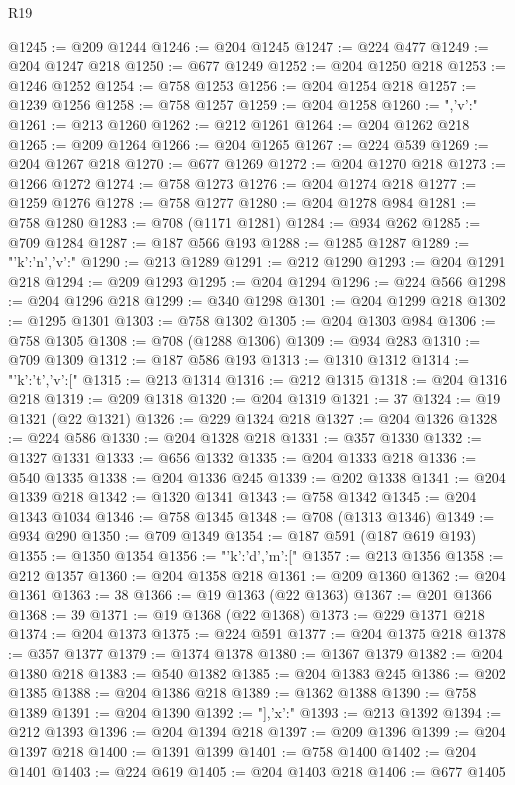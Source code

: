 \begin{lexlean}{R19}
\begin{coremodule}
{{{@1245 := @209 @1244
@1246 := @204 @1245
@1247 := @224 @477
@1249 := @204 @1247 @218
@1250 := @677 @1249
@1252 := @204 @1250 @218
@1253 := @1246 @1252
@1254 := @758 @1253
@1256 := @204 @1254 @218
@1257 := @1239 @1256
@1258 := @758 @1257
@1259 := @204 @1258
@1260 := ",'v':"
@1261 := @213 @1260
@1262 := @212 @1261
@1264 := @204 @1262 @218
@1265 := @209 @1264
@1266 := @204 @1265
@1267 := @224 @539
@1269 := @204 @1267 @218
@1270 := @677 @1269
@1272 := @204 @1270 @218
@1273 := @1266 @1272
@1274 := @758 @1273
@1276 := @204 @1274 @218
@1277 := @1259 @1276
@1278 := @758 @1277
@1280 := @204 @1278 @984
@1281 := @758 @1280
@1283 := @708 (@1171 @1281)
@1284 := @934 @262
@1285 := @709 @1284
@1287 := @187 @566 @193
@1288 := @1285 @1287
@1289 := "{'k':'n','v':"
@1290 := @213 @1289
@1291 := @212 @1290
@1293 := @204 @1291 @218
@1294 := @209 @1293
@1295 := @204 @1294
@1296 := @224 @566
@1298 := @204 @1296 @218
@1299 := @340 @1298
@1301 := @204 @1299 @218
@1302 := @1295 @1301
@1303 := @758 @1302
@1305 := @204 @1303 @984
@1306 := @758 @1305
@1308 := @708 (@1288 @1306)
@1309 := @934 @283
@1310 := @709 @1309
@1312 := @187 @586 @193
@1313 := @1310 @1312
@1314 := "{'k':'t','v':["
@1315 := @213 @1314
@1316 := @212 @1315
@1318 := @204 @1316 @218
@1319 := @209 @1318
@1320 := @204 @1319
@1321 := 37
@1324 := @19 @1321 (@22 @1321)
@1326 := @229 @1324 @218
@1327 := @204 @1326
@1328 := @224 @586
@1330 := @204 @1328 @218
@1331 := @357 @1330
@1332 := @1327 @1331
@1333 := @656 @1332
@1335 := @204 @1333 @218
@1336 := @540 @1335
@1338 := @204 @1336 @245
@1339 := @202 @1338
@1341 := @204 @1339 @218
@1342 := @1320 @1341
@1343 := @758 @1342
@1345 := @204 @1343 @1034
@1346 := @758 @1345
@1348 := @708 (@1313 @1346)
@1349 := @934 @290
@1350 := @709 @1349
@1354 := @187 @591 (@187 @619 @193)
@1355 := @1350 @1354
@1356 := "{'k':'d','m':["
@1357 := @213 @1356
@1358 := @212 @1357
@1360 := @204 @1358 @218
@1361 := @209 @1360
@1362 := @204 @1361
@1363 := 38
@1366 := @19 @1363 (@22 @1363)
@1367 := @201 @1366
@1368 := 39
@1371 := @19 @1368 (@22 @1368)
@1373 := @229 @1371 @218
@1374 := @204 @1373
@1375 := @224 @591
@1377 := @204 @1375 @218
@1378 := @357 @1377
@1379 := @1374 @1378
@1380 := @1367 @1379
@1382 := @204 @1380 @218
@1383 := @540 @1382
@1385 := @204 @1383 @245
@1386 := @202 @1385
@1388 := @204 @1386 @218
@1389 := @1362 @1388
@1390 := @758 @1389
@1391 := @204 @1390
@1392 := "],'x':"
@1393 := @213 @1392
@1394 := @212 @1393
@1396 := @204 @1394 @218
@1397 := @209 @1396
@1399 := @204 @1397 @218
@1400 := @1391 @1399
@1401 := @758 @1400
@1402 := @204 @1401
@1403 := @224 @619
@1405 := @204 @1403 @218
@1406 := @677 @1405
}}}}}}
\end{coremodule}
\end{lexlean}
